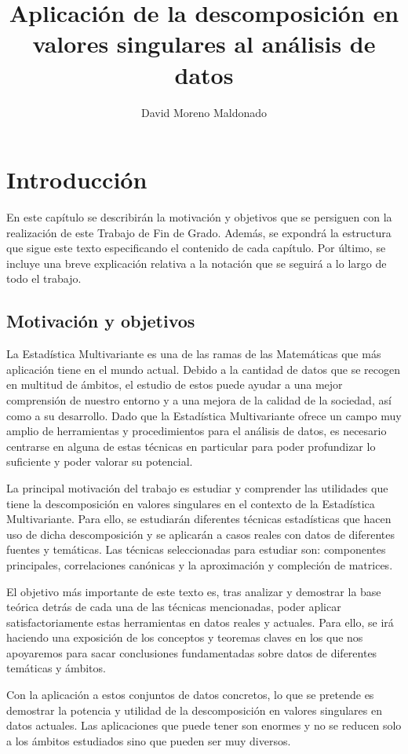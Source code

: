 \documentclass[tfg,cienciasbased,lot,lof,covers,final,overleaf,nocopyright]{tfgtfmthesisuam}
\title{Aplicación de la descomposición en valores singulares al análisis de datos}
\author{David Moreno Maldonado}
\begin{document}
\chapter{Introducción}
En este capítulo se describirán la motivación y objetivos que se persiguen con la realización de este Trabajo de Fin de Grado. Además, se expondrá la estructura que sigue este texto especificando el contenido de cada capítulo. Por último, se incluye una breve explicación relativa a la notación que se seguirá a lo largo de todo el trabajo.

\section{Motivación y objetivos}
La Estadística Multivariante es una de las ramas de las Matemáticas que más aplicación tiene en el mundo actual. Debido a la cantidad de datos que se recogen en multitud de ámbitos, el estudio de estos puede ayudar a una mejor comprensión de nuestro entorno y a una mejora de la calidad de la sociedad, así como a su desarrollo. Dado que la Estadística Multivariante ofrece un campo muy amplio de herramientas y procedimientos para el análisis de datos, es necesario centrarse en alguna de estas técnicas en particular para poder profundizar lo suficiente y poder valorar su potencial.

La principal motivación del trabajo es estudiar y comprender las utilidades que tiene la descomposición en valores singulares en el contexto de la Estadística Multivariante. Para ello, se estudiarán diferentes técnicas estadísticas que hacen uso de dicha descomposición y se aplicarán a casos reales con datos de diferentes fuentes y temáticas. Las técnicas seleccionadas para estudiar son: componentes principales, correlaciones canónicas y la aproximación y compleción de matrices.

El objetivo más importante de este texto es, tras analizar y demostrar la base teórica detrás de cada una de las técnicas mencionadas, poder aplicar satisfactoriamente estas herramientas en datos reales y actuales. Para ello, se irá haciendo una exposición de los conceptos y teoremas claves en los que nos apoyaremos para sacar conclusiones fundamentadas sobre datos de diferentes temáticas y ámbitos.

Con la aplicación a estos conjuntos de datos concretos, lo que se pretende es demostrar la potencia y utilidad de la descomposición en valores singulares en datos actuales. Las aplicaciones que puede tener son enormes y no se reducen solo a los ámbitos estudiados sino que pueden ser muy diversos.
\end{document}
